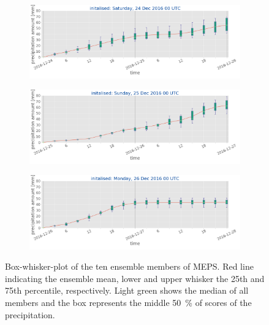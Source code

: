 \\
\begin{figure}[h!]
	\centering
	\begin{subfigure}[b]{\textwidth}
		\centering
		\includegraphics[trim ={0cm 2.2cm 0cm 0cm},clip,width=\textwidth]{./fig_boxplot_sfc/20161224_0}
		\caption{}\label{fig:boxplot:24}
	\end{subfigure}
	\begin{subfigure}[b]{\textwidth}
		\centering
		\includegraphics[trim ={0cm 2.2cm 0cm 0cm},clip,width=\textwidth]{./fig_boxplot_sfc/20161225_0}
		\caption{}\label{fig:boxplot:25}
	\end{subfigure}
	\begin{subfigure}[b]{\textwidth}
		\centering
		\includegraphics[trim ={0cm 1.cm 0cm 0cm},clip,width=\textwidth]{./fig_boxplot_sfc/20161226_0}
		\caption{}\label{fig:boxplot:26}
	\end{subfigure}
	\caption{Box-whisker-plot of the ten ensemble members of MEPS. Red line indicating the ensemble mean, lower and upper whisker the 25th and 75th percentile, respectively. Light green shows the median of all members and the box represents the middle \SI{50}{\percent} of scores of the precipitation.}\label{fig:boxplot}
\end{figure}
